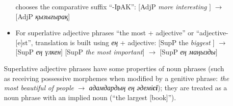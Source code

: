 \documentclass[11pt]{article}
\begin{document}
\begin{description}
\begin{itemize}
   chooses the comparative suffix ``-{I}р{A}{K}'': [AdjP  \emph{more  interesting} ]  $\rightarrow$ [AdjP \emph{қызығ\emph{ырақ}}]
\item For superlative adjective phrases  ``the most + adjective''  or ``adjective-[e]st'', translation 
   is built using \emph{ең} + adjective:  [SupP  the \emph{biggest} ]  $\rightarrow$ [SupP \emph{ең үлкен}] 
   [SupP  \emph{the most important}]   $\rightarrow$ [SupP \emph{ең маңызды}]
\end{itemize}
Superlative adjective phrases have some properties of noun phrases (such as receiving possessive morphemes when 
modified by a genitive phrase: \emph{the most beautiful of people} $\rightarrow$ \emph{адамдардың ең әдемі\textbf{сі}}); they are treated as a noun phrase with an implied noun (``the largest [book]'').

\end{description}
\end{document}
